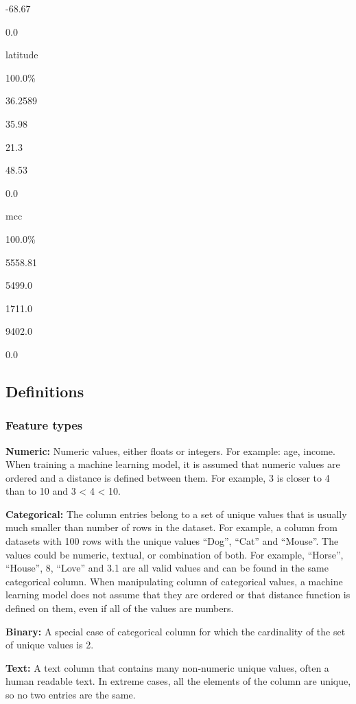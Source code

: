 \documentclass[11pt]{article}
\begin{document}
-68.67

0.0

latitude

100.0\%

36.2589

35.98

21.3

48.53

0.0

mcc

100.0\%

5558.81

5499.0

1711.0

9402.0

0.0

    \hypertarget{definitions}{%
\subsection{Definitions}\label{definitions}}

\hypertarget{feature-types}{%
\subsubsection{Feature types}\label{feature-types}}

\textbf{Numeric:} Numeric values, either floats or integers. For
example: age, income. When training a machine learning model, it is
assumed that numeric values are ordered and a distance is defined
between them. For example, 3 is closer to 4 than to 10 and 3 \textless{}
4 \textless{} 10.

\textbf{Categorical:} The column entries belong to a set of unique
values that is usually much smaller than number of rows in the dataset.
For example, a column from datasets with 100 rows with the unique values
``Dog'', ``Cat'' and ``Mouse''. The values could be numeric, textual, or
combination of both. For example, ``Horse'', ``House'', 8, ``Love'' and
3.1 are all valid values and can be found in the same categorical
column. When manipulating column of categorical values, a machine
learning model does not assume that they are ordered or that distance
function is defined on them, even if all of the values are numbers.

\textbf{Binary:} A special case of categorical column for which the
cardinality of the set of unique values is 2.

\textbf{Text:} A text column that contains many non-numeric unique
values, often a human readable text. In extreme cases, all the elements
of the column are unique, so no two entries are the same.
\end{document}
